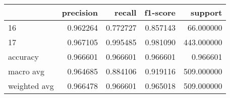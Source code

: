 \begin{tabular}{lrrrr}
\toprule
 & precision & recall & f1-score & support \\
\midrule
16 & 0.962264 & 0.772727 & 0.857143 & 66.000000 \\
17 & 0.967105 & 0.995485 & 0.981090 & 443.000000 \\
accuracy & 0.966601 & 0.966601 & 0.966601 & 0.966601 \\
macro avg & 0.964685 & 0.884106 & 0.919116 & 509.000000 \\
weighted avg & 0.966478 & 0.966601 & 0.965018 & 509.000000 \\
\bottomrule
\end{tabular}
